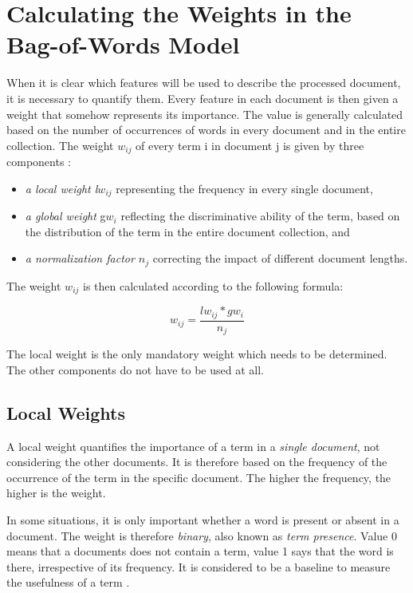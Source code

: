 \section{Calculating the Weights in the Bag-of-Words
Model}

When it is clear which features will be used to describe the processed document,
it is necessary to quantify them. Every feature in each document is then given
a weight that somehow represents its importance. The value is generally calculated based on the number of occurrences of words in every document and in the
entire collection. The weight \( w_{ij} \) of every term i in document j is given by three
components \cite{ref236}:

\begin{itemize}
    \item \textit{a local weight l\( w_{ij} \)} representing the frequency in every single document,

    \item \textit{a global weight} g\( w_{i} \) reflecting the discriminative ability of the term, based
on the distribution of the term in the entire document collection, and

    \item \textit{a normalization factor \( n_{j} \)} correcting the impact of different document
lengths.
\end{itemize}

The weight \( w_{ij} \) is then calculated according to the following formula:

\[
w_{ij} = \frac{l w_{ij} * g w_i}{n_j}
\tag{3.4}
\]

The local weight is the only mandatory weight which needs to be determined.
The other components do not have to be used at all.

\subsection{Local Weights}

A local weight quantifies the importance of a term in a \textit{single document}, not
considering the other documents. It is therefore based on the frequency of the
occurrence of the term in the specific document. The higher the frequency, the
higher is the weight.

In some situations, it is only important whether a word is present or absent in
a document. The weight is therefore \textit{binary}, also known as \textit{term presence}. Value
0 means that a documents does not contain a term, value 1 says that the word is
there, irrespective of its frequency. It is considered to be a baseline to measure
the usefulness of a term \cite{ref252}.


